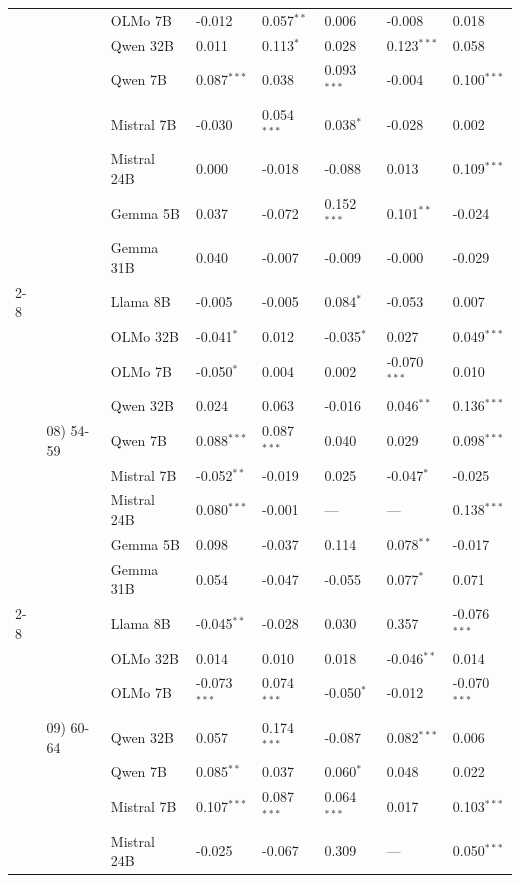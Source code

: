 \begin{longtable}[t]{llllllll}
 &  & OLMo 7B & -0.012 & 0.057$^{**}$ & 0.006 & -0.008 & 0.018 \\
 &  & Qwen 32B & 0.011 & 0.113$^{*}$ & 0.028 & 0.123$^{***}$ & 0.058 \\
 &  & Qwen 7B & 0.087$^{***}$ & 0.038 & 0.093$^{***}$ & -0.004 & 0.100$^{***}$ \\
 &  & Mistral 7B & -0.030 & 0.054$^{***}$ & 0.038$^{*}$ & -0.028 & 0.002 \\
 &  & Mistral 24B & 0.000 & -0.018 & -0.088 & 0.013 & 0.109$^{***}$ \\
 &  & Gemma 5B & 0.037 & -0.072 & 0.152$^{***}$ & 0.101$^{**}$ & -0.024 \\
 &  & Gemma 31B & 0.040 & -0.007 & -0.009 & -0.000 & -0.029 \\
\cline{2-8}
 & \multirow[t]{9}{*}{08) 54-59} & Llama 8B & -0.005 & -0.005 & 0.084$^{*}$ & -0.053 & 0.007 \\
 &  & OLMo 32B & -0.041$^{*}$ & 0.012 & -0.035$^{*}$ & 0.027 & 0.049$^{***}$ \\
 &  & OLMo 7B & -0.050$^{*}$ & 0.004 & 0.002 & -0.070$^{***}$ & 0.010 \\
 &  & Qwen 32B & 0.024 & 0.063 & -0.016 & 0.046$^{**}$ & 0.136$^{***}$ \\
 &  & Qwen 7B & 0.088$^{***}$ & 0.087$^{***}$ & 0.040 & 0.029 & 0.098$^{***}$ \\
 &  & Mistral 7B & -0.052$^{**}$ & -0.019 & 0.025 & -0.047$^{*}$ & -0.025 \\
 &  & Mistral 24B & 0.080$^{***}$ & -0.001 & --- & --- & 0.138$^{***}$ \\
 &  & Gemma 5B & 0.098 & -0.037 & 0.114 & 0.078$^{**}$ & -0.017 \\
 &  & Gemma 31B & 0.054 & -0.047 & -0.055 & 0.077$^{*}$ & 0.071 \\
\cline{2-8}
 & \multirow[t]{9}{*}{09) 60-64} & Llama 8B & -0.045$^{**}$ & -0.028 & 0.030 & 0.357 & -0.076$^{***}$ \\
 &  & OLMo 32B & 0.014 & 0.010 & 0.018 & -0.046$^{**}$ & 0.014 \\
 &  & OLMo 7B & -0.073$^{***}$ & 0.074$^{***}$ & -0.050$^{*}$ & -0.012 & -0.070$^{***}$ \\
 &  & Qwen 32B & 0.057 & 0.174$^{***}$ & -0.087 & 0.082$^{***}$ & 0.006 \\
 &  & Qwen 7B & 0.085$^{**}$ & 0.037 & 0.060$^{*}$ & 0.048 & 0.022 \\
 &  & Mistral 7B & 0.107$^{***}$ & 0.087$^{***}$ & 0.064$^{***}$ & 0.017 & 0.103$^{***}$ \\
 &  & Mistral 24B & -0.025 & -0.067 & 0.309 & --- & 0.050$^{***}$ \\

\end{longtable}

